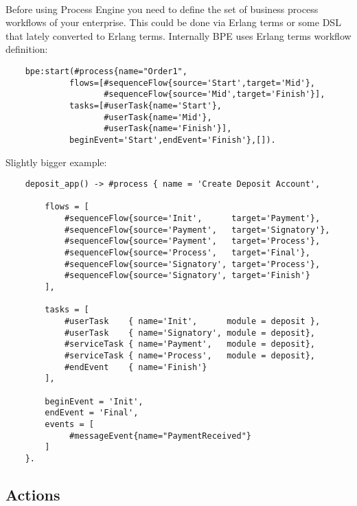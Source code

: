 \paragraph{}
Before using Process Engine you need to define the set of business process
workflows of your enterprise. This could be done via Erlang terms or some DSL
that lately converted to Erlang terms. Internally BPE uses Erlang terms
workflow definition:

\vspace{1\baselineskip}
\begin{lstlisting}
    bpe:start(#process{name="Order1",
             flows=[#sequenceFlow{source='Start',target='Mid'},
                    #sequenceFlow{source='Mid',target='Finish'}],
             tasks=[#userTask{name='Start'},
                    #userTask{name='Mid'},
                    #userTask{name='Finish'}],
             beginEvent='Start',endEvent='Finish'},[]).
\end{lstlisting}


\newpage
Slightly bigger example:

\vspace{1\baselineskip}
\begin{lstlisting}
    deposit_app() -> #process { name = 'Create Deposit Account',

        flows = [
            #sequenceFlow{source='Init',      target='Payment'},
            #sequenceFlow{source='Payment',   target='Signatory'},
            #sequenceFlow{source='Payment',   target='Process'},
            #sequenceFlow{source='Process',   target='Final'},
            #sequenceFlow{source='Signatory', target='Process'},
            #sequenceFlow{source='Signatory', target='Finish'}
        ],

        tasks = [
            #userTask    { name='Init',      module = deposit },
            #userTask    { name='Signatory', module = deposit},
            #serviceTask { name='Payment',   module = deposit},
            #serviceTask { name='Process',   module = deposit},
            #endEvent    { name='Finish'}
        ],

        beginEvent = 'Init',
        endEvent = 'Final',
        events = [
             #messageEvent{name="PaymentReceived"}
        ]
    }.
\end{lstlisting}

\subsection{Actions}

